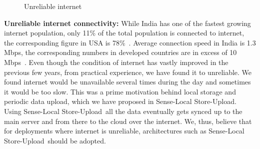 \documentclass[10pt]{sensys-proc}
\newcommand{\paradigm}{Sense-Local Store-Upload}
\newcommand{\paradigms}{Sense-Local Store-Upload~}
\begin{document}
\begin{figure}
        \vspace{-3mm}
  \caption{Unreliable internet}
  
      \label{fig:unreliable_internet}
\end{figure}

\noindent \textbf{Unreliable internet connectivity:} While India has one of the fastest growing internet population, only 11\% of the total population is connected to internet, the corresponding figure in USA is 78\%~\cite{meyer}. Average connection speed in India is 1.3 Mbps, the corresponding numbers in developed countries are in excess of 10 Mbps~\cite{state_of_internet}. Even though the condition of internet has vastly improved in the previous few years, from practical experience, we have found it to unreliable. We found internet would be unavailable several times during the day and sometimes it would be too slow. This was a prime motivation behind local storage and periodic data upload, which we have proposed in \paradigm. Using \paradigms all the data eventually gets synced up to the main server and from there to the cloud over the internet. We, thus, believe that for deployments where internet is unreliable, architectures such as \paradigms should be adopted.
\end{document}
